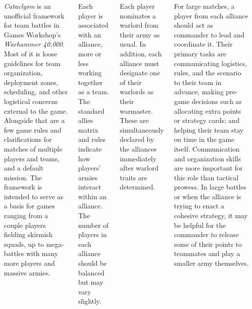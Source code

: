 \documentclass{40k}
\begin{document}

\begin{columns}

  \emph{Cataclysm} is an unofficial framework for team battles in
  Games Workshop's \emph{Warhammer 40,000}.  Most of it is loose
  guidelines for team organization, deployment zones, scheduling, and
  other logistical concerns external to the game.  Alongside that are
  a few game rules and clarifications for matches of multiple players
  and teams, and a default mission.  The framework is intended to
  serve as a basis for games ranging from a couple players fielding
  skirmish squads, up to mega-battles with many more players and
  massive armies.

%

Each player is associated with an alliance, more or less working
together as a team.  The standard allies matrix and rules indicate how
players' armies interact within an alliance.  The number of players in
each alliance should be balanced but may vary slightly.

Each player nominates a warlord from their army as usual.  In
addition, each alliance must designate one of their warlords as their
warmaster.  These are simultaneously declared by the alliances
immediately after warlord traits are determined.


For large matches, a player from each alliance should act as commander
to lead and coordinate it.  Their primary tasks are communicating
logistics, rules, and the scenario to their team in advance, making
pre-game decisions such as allocating extra points or strategy cards;
and helping their team stay on time in the game itself.  Communication
and organization skills are more important for this role than tactical
prowess.  In large battles or when the alliance is trying to enact a
cohesive strategy, it may be helpful for the commander to release some
of their points to teammates and play a smaller army themselves.

%


\end{columns}
\end{document}
